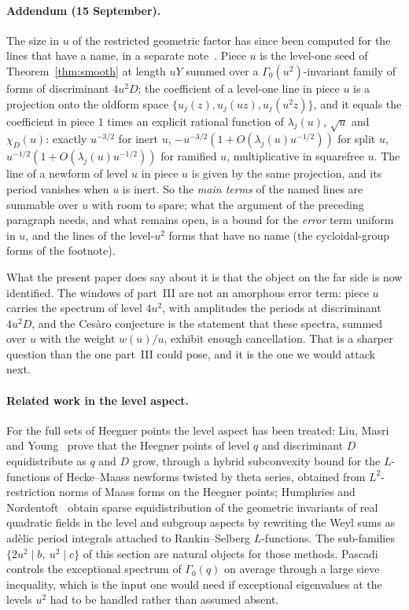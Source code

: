 \documentclass[11pt,a4paper]{article}
\theoremstyle{remark}\newtheorem{remark}[theorem]{Remark}
\begin{document}
\paragraph{Addendum (15 September).} The size in $u$ of the restricted geometric factor has since been computed for
the lines that have a name, in a separate note~\cite{ReichardtDilation}. Piece $u$ is the level-one seed of
Theorem~\ref{thm:smooth} at length $uY$ summed over a $\Gamma_0(u^2)$-invariant family of forms of discriminant $4u^2D$; the
coefficient of a level-one line in piece $u$ is a projection onto the oldform space $\{u_j(z),u_j(uz),u_j(u^2z)\}$, and it
equals the coefficient in piece $1$ times an explicit rational function of $\lambda_j(u)$, $\sqrt u$ and $\chi_D(u)$: exactly
$u^{-3/2}$ for inert $u$, $-u^{-3/2}(1+O(\lambda_j(u)u^{-1/2}))$ for split $u$, $u^{-1/2}(1+O(\lambda_j(u)u^{-1/2}))$ for ramified $u$,
multiplicative in squarefree $u$. The line of a newform of level $u$ in piece $u$ is given by the same projection, and its
period vanishes when $u$ is inert. So the \emph{main terms} of the named lines are summable over $u$ with room to spare;
what the argument of the preceding paragraph needs, and what remains open, is a bound for the \emph{error} term uniform in
$u$, and the lines of the level-$u^2$ forms that have no name (the cycloidal-group forms of the footnote).

What the present paper does say about it is that the object on the far side is now identified. The windows of
part~III are not an amorphous error term: piece $u$ carries the spectrum of level $4u^2$, with amplitudes the
periods at discriminant $4u^2D$, and the Ces\`aro conjecture is the statement that these spectra, summed over $u$
with the weight $w(u)/u$, exhibit enough cancellation. That is a sharper question than the one part~III could pose,
and it is the one we would attack next.

\paragraph{Related work in the level aspect.} For the full sets of Heegner points the level aspect has been treated:
Liu, Masri and Young~\cite{LiuMasriYoung2013} prove that the Heegner points of level $q$ and discriminant $D$
equidistribute as $q$ and $D$ grow, through a hybrid subconvexity bound for the $L$-functions of Hecke--Maass newforms
twisted by theta series, obtained from $L^2$-restriction norms of Maass forms on the Heegner points; Humphries and
Nordentoft~\cite{HumphriesNordentoft2025} obtain sparse equidistribution of the geometric invariants of real quadratic
fields in the level and subgroup aspects by rewriting the Weyl sums as ad\`elic period integrals attached to
Rankin--Selberg $L$-functions. The sub-families $\{2u^2\mid b,\ u^2\mid c\}$ of this section are natural objects for those
methods. Pascadi~\cite{Pascadi2026} controls the exceptional spectrum of $\Gamma_0(q)$ on average through a large sieve
inequality, which is the input one would need if exceptional eigenvalues at the levels $u^2$ had to be handled rather
than assumed absent.
\end{document}
